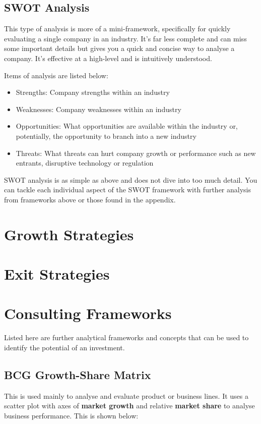 \documentclass[a4paper]{article}
\begin{document}
{\subsection{SWOT Analysis}
This type of analysis is more of a mini-framework, specifically for quickly evaluating a single company in an industry. It's far less complete and can miss some important details but gives you a quick and concise way to analyse a company. It's effective at a high-level and is intuitively understood.

\vspace{5pt}
\noindent Items of analysis are listed below:
\begin{itemize}
	\item Strengths: Company strengths within an industry
	\item Weaknesses: Company weaknesses within an industry
	\item Opportunities: What opportunities are available within the industry or, potentially, the opportunity to branch into a new industry
	\item Threats: What threats can hurt company growth or performance such as new entrants, disruptive technology or regulation
\end{itemize}
SWOT analysis is as simple as above and does not dive into too much detail. You can tackle each individual aspect of the SWOT framework with further analysis from frameworks above or those found in the appendix.


\newpage
\section{Growth Strategies}
\Blindtext

\newpage
\section{Exit Strategies}
\Blindtext

\newpage
\appendix
\section{Consulting Frameworks}
Listed here are further analytical frameworks and concepts that can be used to identify the potential of an investment.

\subsection{BCG Growth-Share Matrix}
This is used mainly to analyse and evaluate product or business lines. It uses a scatter plot with axes of \textbf{market growth} and relative \textbf{market share} to analyse business performance. This is shown below:

}
\end{document}
